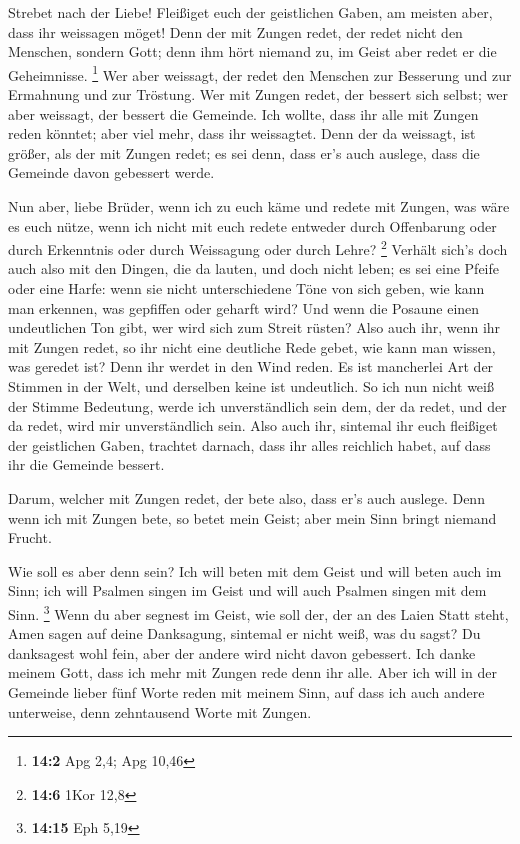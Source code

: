  Strebet nach der Liebe! Fleißiget euch der geistlichen
Gaben, am meisten aber, dass ihr weissagen möget!  Denn der
mit Zungen redet, der redet nicht den Menschen, sondern Gott; denn ihm
hört niemand zu, im Geist aber redet er die Geheimnisse. \footnote{\textbf{14:2}
  Apg 2,4; Apg 10,46}  Wer aber weissagt, der redet den
Menschen zur Besserung und zur Ermahnung und zur Tröstung. 
Wer mit Zungen redet, der bessert sich selbst; wer aber weissagt, der
bessert die Gemeinde.  Ich wollte, dass ihr alle mit Zungen
reden könntet; aber viel mehr, dass ihr weissagtet. Denn der da
weissagt, ist größer, als der mit Zungen redet; es sei denn, dass er's
auch auslege, dass die Gemeinde davon gebessert werde.

 Nun aber, liebe Brüder, wenn ich zu euch käme und redete
mit Zungen, was wäre es euch nütze, wenn ich nicht mit euch redete
entweder durch Offenbarung oder durch Erkenntnis oder durch Weissagung
oder durch Lehre? \footnote{\textbf{14:6} 1Kor 12,8} 
Verhält sich's doch auch also mit den Dingen, die da lauten, und doch
nicht leben; es sei eine Pfeife oder eine Harfe: wenn sie nicht
unterschiedene Töne von sich geben, wie kann man erkennen, was gepfiffen
oder geharft wird?  Und wenn die Posaune einen undeutlichen
Ton gibt, wer wird sich zum Streit rüsten?  Also auch ihr,
wenn ihr mit Zungen redet, so ihr nicht eine deutliche Rede gebet, wie
kann man wissen, was geredet ist? Denn ihr werdet in den Wind reden.
 Es ist mancherlei Art der Stimmen in der Welt, und
derselben keine ist undeutlich.  So ich nun nicht weiß der
Stimme Bedeutung, werde ich unverständlich sein dem, der da redet, und
der da redet, wird mir unverständlich sein.  Also auch ihr,
sintemal ihr euch fleißiget der geistlichen Gaben, trachtet darnach,
dass ihr alles reichlich habet, auf dass ihr die Gemeinde bessert.

 Darum, welcher mit Zungen redet, der bete also, dass er's
auch auslege.  Denn wenn ich mit Zungen bete, so betet mein
Geist; aber mein Sinn bringt niemand Frucht.

 Wie soll es aber denn sein? Ich will beten mit dem Geist
und will beten auch im Sinn; ich will Psalmen singen im Geist und will
auch Psalmen singen mit dem Sinn. \footnote{\textbf{14:15} Eph 5,19}
 Wenn du aber segnest im Geist, wie soll der, der an des
Laien Statt steht, Amen sagen auf deine Danksagung, sintemal er nicht
weiß, was du sagst?  Du danksagest wohl fein, aber der
andere wird nicht davon gebessert.  Ich danke meinem Gott,
dass ich mehr mit Zungen rede denn ihr alle.  Aber ich will
in der Gemeinde lieber fünf Worte reden mit meinem Sinn, auf dass ich
auch andere unterweise, denn zehntausend Worte mit Zungen.

